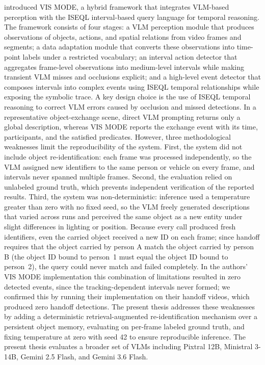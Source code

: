 \citet{crescitelli2026eccv} introduced VIS MODE, a hybrid framework that integrates VLM-based perception with the ISEQL interval-based query language for temporal reasoning. The framework consists of four stages: a VLM perception module that produces observations of objects, actions, and spatial relations from video frames and segments; a data adaptation module that converts these observations into time-point labels under a restricted vocabulary; an interval action detector that aggregates frame-level observations into medium-level intervals while making transient VLM misses and occlusions explicit; and a high-level event detector that composes intervals into complex events using ISEQL temporal relationships while exposing the symbolic trace. A key design choice is the use of ISEQL temporal reasoning to correct VLM errors caused by occlusion and missed detections. In a representative object-exchange scene, direct VLM prompting returns only a global description, whereas VIS MODE reports the exchange event with its time, participants, and the satisfied predicates. However, three methodological weaknesses limit the reproducibility of the system. First, the system did not include object re-identification: each frame was processed independently, so the VLM assigned new identifiers to the same person or vehicle on every frame, and intervals never spanned multiple frames. Second, the evaluation relied on unlabeled ground truth, which prevents independent verification of the reported results. Third, the system was non-deterministic: inference used a temperature greater than zero with no fixed seed, so the VLM freely generated descriptions that varied across runs and perceived the same object as a new entity under slight differences in lighting or position. Because every call produced fresh identifiers, even the carried object received a new ID on each frame; since handoff requires that the object carried by person A match the object carried by person B (the object ID bound to person~1 must equal the object ID bound to person~2), the query could never match and failed completely. In the authors' VIS MODE implementation this combination of limitations resulted in zero detected events, since the tracking-dependent intervals never formed; we confirmed this by running their implementation on their handoff videos, which produced zero handoff detections. The present thesis addresses these weaknesses by adding a deterministic retrieval-augmented re-identification mechanism over a persistent object memory, evaluating on per-frame labeled ground truth, and fixing temperature at zero with seed 42 to ensure reproducible inference. The present thesis evaluates a broader set of VLMs including Pixtral 12B, Ministral 3-14B, Gemini 2.5 Flash, and Gemini 3.6 Flash.

